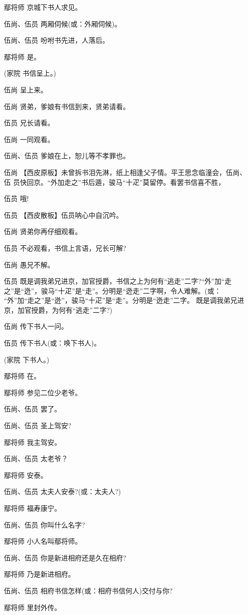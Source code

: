 鄢将师 京城下书人求见。

伍尚、伍员 两厢伺候(或：外厢伺候)。

伍尚、伍员 吩咐书先进，人落后。

鄢将师 是。

(家院 书信呈上。)

伍尚 呈上来。

伍尚 贤弟，爹娘有书信到来，贤弟请看。

伍员 兄长请看。

伍尚 一同观看。

伍尚、伍员 爹娘在上，恕儿等不孝罪也。

伍尚
【西皮原板】未曾拆书泪先淋，纸上相逢父子情。平王思念临潼会，伍尚、伍
员快回京。``外加走之''书后遁，骏马``十疋''莫留停。看罢书信喜不胜，

伍员 哦!

伍员 【西皮散板】伍员呐心中自沉吟。

伍尚 贤弟你再仔细观看。

伍员 不必观看，书信上言语，兄长可解?

伍尚 愚兄不解。

伍员 既是调我弟兄进京，加官授爵，书信之上为何有``逃走''二字?``外''加``走
之''是``迯''，骏马``十疋''是``走''。分明是``迯走''二字啊，令人难解。(或：
``外''加``走之''是``迯''，骏马``十疋''是``走''。分明是``迯走''二字。
既是调我弟兄进京，加官授爵，为何有``逃走''二字?)

伍尚 传下书人一问。

伍员 传下书人(或：唤下书人)。

(家院 下书人。)

鄢将师 在。

鄢将师 参见二位少老爷。

伍尚、伍员 罢了。

伍尚、伍员 圣上驾安?

鄢将师 我主驾安。

伍尚、伍员 太老爷？

鄢将师 安泰。

伍尚、伍员 太夫人安泰?(或：太夫人?)

鄢将师 福寿康宁。

伍尚、伍员 你叫什么名字?

鄢将师 小人名叫鄢将师。

伍尚、伍员 你是新进相府还是久在相府?

鄢将师 乃是新进相府。

伍尚、伍员 相府书信怎样(或：相府书信何人)交付与你?

鄢将师 里封外传。

